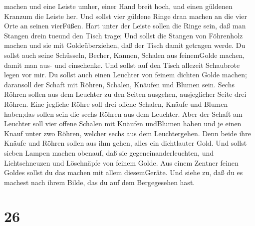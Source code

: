 machen  und eine Leiste umher, einer Hand breit hoch, und
einen güldenen Kranzum die Leiste her.  Und sollst vier
güldene Ringe dran machen an die vier Orte an seinen vierFüßen.
 Hart unter der Leiste sollen die Ringe sein, daß man
Stangen drein tueund den Tisch trage;  Und sollst die
Stangen von Föhrenholz machen und sie mit Goldeüberziehen, daß der Tisch
damit getragen werde.  Du sollst auch seine Schüsseln,
Becher, Kannen, Schalen aus feinemGolde machen, damit man aus- und
einschenke.  Und sollst auf den Tisch allezeit Schaubrote
legen vor mir.  Du sollst auch einen Leuchter von feinem
dichten Golde machen; daransoll der Schaft mit Röhren, Schalen, Knäufen
und Blumen sein.  Sechs Röhren sollen aus dem Leuchter zu
den Seiten ausgehen, ausjeglicher Seite drei Röhren.  Eine
jegliche Röhre soll drei offene Schalen, Knäufe und Blumen haben;das
sollen sein die sechs Röhren aus dem Leuchter.  Aber der
Schaft am Leuchter soll vier offene Schalen mit Knäufen undBlumen haben
 und je einen Knauf unter zwo Röhren, welcher sechs aus dem
Leuchtergehen.  Denn beide ihre Knäufe und Röhren sollen
aus ihm gehen, alles ein dichtlauter Gold.  Und sollst
sieben Lampen machen obenauf, daß sie gegeneinanderleuchten,
 und Lichtschneuzen und Löschnäpfe von feinem Golde.
 Aus einem Zentner feinen Goldes sollst du das machen mit
allem diesemGeräte.  Und siehe zu, daß du es machest nach
ihrem Bilde, das du auf dem Bergegesehen hast.

\hypertarget{section-25}{%
\section{26}\label{section-25}}

